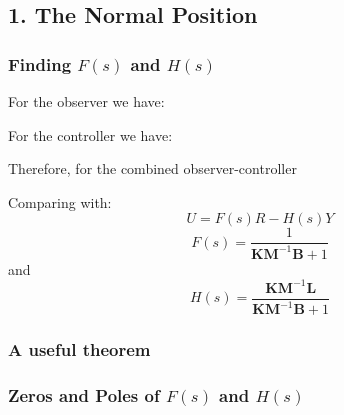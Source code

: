 \subsection*{1. The Normal Position} %
\label{sub:1_the_normal_position}


\ifslidesonly
\begin{slide}
   
\end{slide}
\fi



\subsubsection*{Finding $F(s)$ and $H(s)$} %
\label{ssub:finding_f_s_and_h_s_}

For the observer we have:

\ifslidesonly
\begin{slide}
   
\end{slide}
\fi

For the controller we have:

\ifslidesonly
\begin{slide}
   
\end{slide}
\fi

Therefore, for the combined observer-controller

\ifslidesonly
\begin{slide}
   
\end{slide}
\fi


Comparing with: $$U=F(s)R-H(s)Y$$
\[
F(s) = \frac{1}{\mathbf{KM}^{-1}\mathbf{B}+1}
\]
and
\[
H(s) = \frac{\mathbf{KM}^{-1}\mathbf{L}}{\mathbf{KM}^{-1}\mathbf{B}+1}
\]


 

\subsubsection*{A useful theorem} %
\label{ssub:a_useful_theorem}


\ifslidesonly
\begin{slide}
   
\end{slide}
\fi

 
\subsubsection*{Zeros and Poles of $F(s)$ and $H(s)$} %
\label{ssub:zeros_and_poles_of_f_s_and_h_s_}


